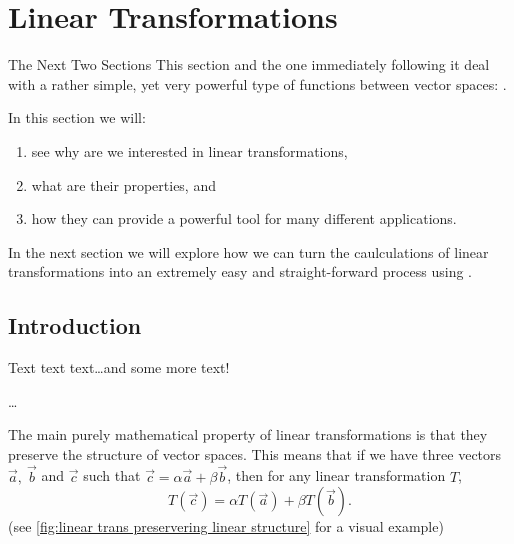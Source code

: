 \section{Linear Transformations}
\begin{summary}{The Next Two Sections}{}
	This section and the one immediately following it deal with a rather simple, yet very powerful type of functions between vector spaces: .

	In this section we will:
	\begin{enumerate}
		\item see why are we interested in linear transformations,
		\item what are their properties, and
		\item how they can provide a powerful tool for many different applications.
	\end{enumerate}

	In the next section we will explore how we can turn the caulculations of linear transformations into an extremely easy and straight-forward process using .
\end{summary}

\subsection{Introduction}
Text text text\dots and some more text!

\dots

The main purely mathematical property of linear transformations is that they preserve the structure of vector spaces. This means that if we have three vectors $\vec{a},\ \vec{b}$ and $\vec{c}$ such that $\vec{c}=\alpha\vec{a}+\beta\vec{b}$, then for any linear transformation $T$,
\begin{equation}
	T(\vec{c}) = \alpha T(\vec{a}) + \beta T(\vec{b}).
	\label{eq:}
\end{equation}
(see \autoref{fig:linear trans preservering linear structure} for a visual example)

